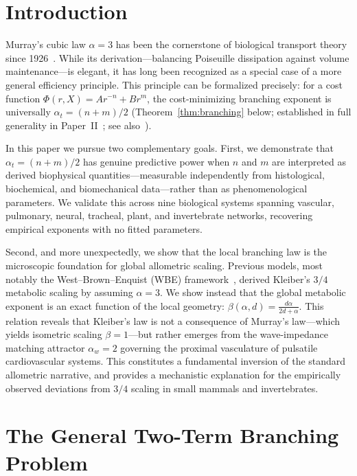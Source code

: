 \documentclass[11pt,a4paper]{article}
\theoremstyle{remark}
\begin{document}
\section{Introduction}

Murray's cubic law $\alpha = 3$ has been the cornerstone of biological
transport theory since 1926~\cite{murray1926}. While its
derivation---balancing Poiseuille dissipation against volume
maintenance---is elegant, it has long been recognized as a special case
of a more general efficiency principle. This principle can be formalized
precisely: for a cost function $\Phi(r,X) = Ar^{-n} + Br^m$, the
cost-minimizing branching exponent is universally $\alpha_t = (n+m)/2$
(Theorem~\ref{thm:branching} below; established in full generality in Paper~II~\cite{paperII}; see also~\cite{bennett2025}).

In this paper we pursue two complementary goals. First, we demonstrate
that $\alpha_t = (n+m)/2$ has genuine predictive power when $n$ and $m$
are interpreted as derived biophysical quantities---measurable
independently from histological, biochemical, and biomechanical
data---rather than as phenomenological parameters. We validate this
across nine biological systems spanning vascular, pulmonary, neural,
tracheal, plant, and invertebrate networks, recovering empirical
exponents with no fitted parameters.

Second, and more unexpectedly, we show that the local branching law is the
microscopic foundation for global allometric scaling. Previous models, most
notably the West--Brown--Enquist (WBE) framework~\cite{west1997}, derived
Kleiber's $3/4$ metabolic scaling by assuming $\alpha = 3$. We show instead that
the global metabolic exponent is an exact function of the local geometry:
$\beta(\alpha, d) = \frac{d\alpha}{2d+\alpha}$. This relation reveals that
Kleiber's law is not a consequence of Murray's law---which yields isometric
scaling $\beta = 1$---but rather emerges from the wave-impedance matching
attractor $\alpha_w = 2$ governing the proximal vasculature of pulsatile
cardiovascular systems. This constitutes a fundamental inversion of the standard
allometric narrative, and provides a mechanistic explanation for the empirically
observed deviations from $3/4$ scaling in small mammals and invertebrates.

\section{The General Two-Term Branching Problem}
\end{document}
